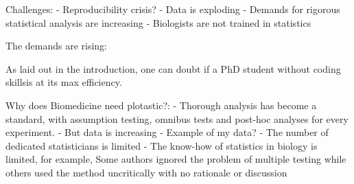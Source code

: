 








Challenges:
- Reproducibility crisis?
- Data is exploding
- Demands for rigorous statistical analysis are increasing
- Biologists are not trained in statistics


The demands are rising: \cite{moreno-indiasStatisticalMachineLearning2021}



As laid out in the introduction, one can doubt if a PhD student without coding
skillsis at its max efficiency.

Why does Biomedicine need plotastic?:
- Thorough analysis has become a standard, with assumption testing, omnibus
tests and post-hoc analyses for every experiment.
- But data is increasing
- Example of my data?
- The number of dedicated statisticians is limited
- The know-how of statistics in biology is limited, for example, Some authors
ignored the problem of multiple testing while others used the method
uncritically with no rationale or discussion \cite{pernegerWhatWrongBonferroni1998,armstrongWhenUseBonferroni2014}


